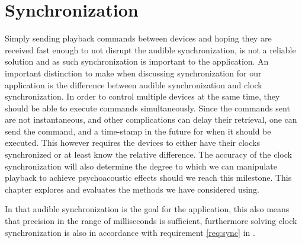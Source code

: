 \chapter{Synchronization}\label{cha:sync}
Simply sending playback commands between devices and hoping they are received fast enough to not disrupt the audible synchronization, is not a reliable solution and as such synchronization is important to the application.
An important distinction to make when discussing synchronization for our application is the difference between audible synchronization and clock synchronization.
In order to control multiple devices at the same time, they should be able to execute commands simultaneously.
Since the commands sent are not instantaneous, and other complications can delay their retrieval, one can send the command, and a time-stamp in the future for when it should be executed.
This however requires the devices to either have their clocks synchronized or at least know the relative difference.
The accuracy of the clock synchronization will also determine the degree to which we can manipulate playback to achieve psychoacoustic effects should we reach this milestone.
This chapter explores and evaluates the methods we have considered using.

In that audible synchronization is the goal for the application, this also means that precision in the range of milliseconds is sufficient, furthermore solving clock synchronization is also in accordance with requirement \ref{req:sync} in .


